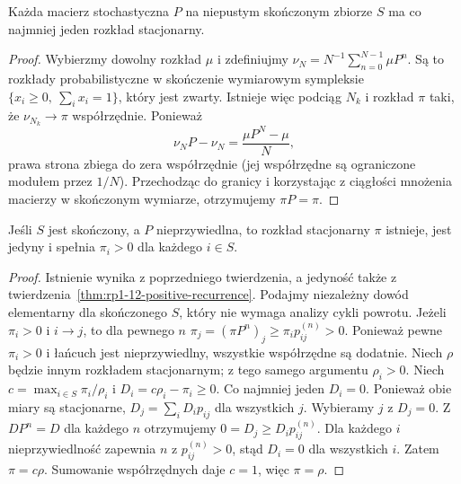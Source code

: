\begin{twierdzenie}
Każda macierz stochastyczna $P$ na niepustym
skończonym zbiorze $S$ ma co najmniej jeden
rozkład stacjonarny.
\end{twierdzenie}
\begin{proof}
Wybierzmy dowolny rozkład $\mu$ i zdefiniujmy
$\nu_N=N^{-1}\sum_{n=0}^{N-1}\mu P^n$.
Są to rozkłady probabilistyczne w skończenie
wymiarowym sympleksie
$\{x_i\geq0,\ \sum_i x_i=1\}$, który jest zwarty.
Istnieje więc podciąg $N_k$ i rozkład $\pi$ taki,
że $\nu_{N_k}\to\pi$ współrzędnie. Ponieważ
\[
\nu_NP-\nu_N=\frac{\mu P^N-\mu}{N},
\]
prawa strona zbiega do zera współrzędnie
(jej współrzędne są ograniczone modułem przez $1/N$).
Przechodząc do granicy i korzystając z ciągłości
mnożenia macierzy w skończonym wymiarze,
otrzymujemy $\pi P=\pi$.
\end{proof}

\begin{twierdzenie}
Jeśli $S$ jest skończony, a $P$ nieprzywiedlna,
to rozkład stacjonarny $\pi$ istnieje, jest jedyny
i spełnia $\pi_i>0$ dla każdego $i\in S$.
\end{twierdzenie}
\begin{proof}
Istnienie wynika z poprzedniego twierdzenia,
a jedyność także z twierdzenia~\ref{thm:rp1-12-positive-recurrence}.
Podajmy niezależny dowód elementarny dla skończonego
$S$, który nie wymaga analizy cykli powrotu.
Jeżeli $\pi_i>0$ i $i\to j$, to dla pewnego $n$
$\pi_j=(\pi P^n)_j\geq\pi_i p_{ij}^{(n)}>0$.
Ponieważ pewne $\pi_i>0$ i łańcuch jest
nieprzywiedlny, wszystkie współrzędne są dodatnie.
Niech $\rho$ będzie innym rozkładem stacjonarnym;
z tego samego argumentu $\rho_i>0$.
Niech $c=\max_{i\in S}\pi_i/\rho_i$ i
$D_i=c\rho_i-\pi_i\geq0$. Co najmniej jeden $D_i=0$.
Ponieważ obie miary są stacjonarne,
$D_j=\sum_iD_i p_{ij}$ dla wszystkich $j$.
Wybieramy $j$ z $D_j=0$. Z $DP^n=D$ dla
każdego $n$ otrzymujemy
$0=D_j\geq D_i p_{ij}^{(n)}$. Dla każdego $i$
nieprzywiedlność zapewnia $n$ z $p_{ij}^{(n)}>0$,
stąd $D_i=0$ dla wszystkich $i$. Zatem $\pi=c\rho$.
Sumowanie współrzędnych daje $c=1$, więc
$\pi=\rho$.
\end{proof}

